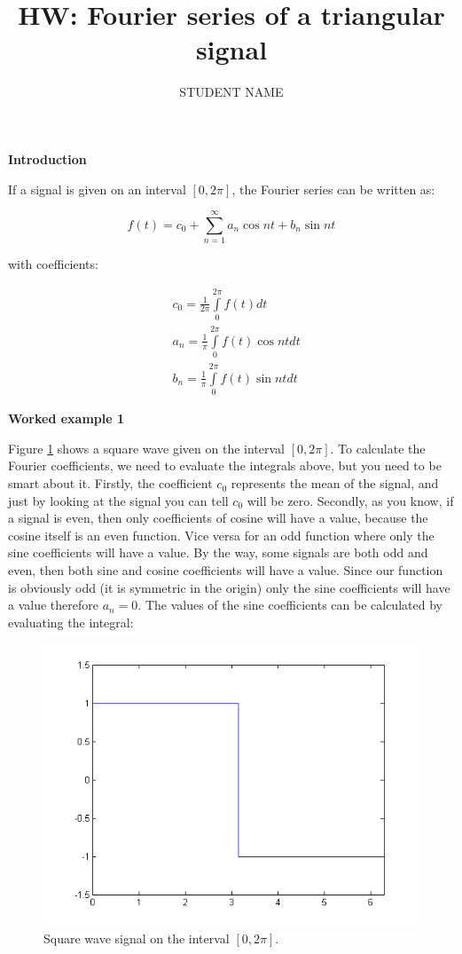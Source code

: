 \documentclass[11pt,letterpaper]{article}
\author{STUDENT NAME}
\title{HW: Fourier series of a triangular signal}
\begin{document}
\maketitle

\textbf{Introduction}

If a signal is given on an interval $[0, 2 \pi]$, the Fourier series can be written as:

\begin{equation}\label{HW_FourierSeries1}
f(t) = c_0 + \sum\limits_{n=1}^{\infty} a_n \cos nt + b_n \sin nt 
\end{equation}

with coefficients:

\begin{align}\label{HW_FourierSeries2}
 & c_0=\frac{1}{2\pi }\int\limits_{0}^{2\pi }{f\left( t \right)dt} \\ 
 & a_n=\frac{1}{\pi }\int\limits_{0}^{2\pi }{f\left( t \right)\cos ntdt} \\ 
 & b_n=\frac{1}{\pi }\int\limits_{0}^{2\pi }{f\left( t \right)\sin ntdt}
\end{align}

\textbf{Worked example 1}

Figure \ref{fig:HW_FourierSeries1} shows a square wave given on the interval $[0, 2 \pi]$. To calculate the Fourier coefficients, we need to evaluate the integrals above, but you need to be smart about it. Firstly, the coefficient $c_0$ represents the mean of the signal, and just by looking at the signal you can tell $c_0$ will be zero. Secondly, as you know, if a signal is even, then only coefficients of cosine will have a value, because the cosine itself is an even function. Vice versa for an odd function where only the sine coefficients will have a value. By the way, some signals are both odd and even, then both sine and cosine coefficients will have a value. Since our function is obviously odd (it is symmetric in the origin) only the sine coefficients will have a value therefore $a_n = 0$. The values of the sine coefficients can be calculated by evaluating the integral:

\begin{figure}
\centering
\includegraphics[width=0.7\linewidth]{HW_FourierSeries1}
\caption{Square wave signal on the interval $[0, 2 \pi]$.}
\label{fig:HW_FourierSeries1}
\end{figure}
\end{document}
